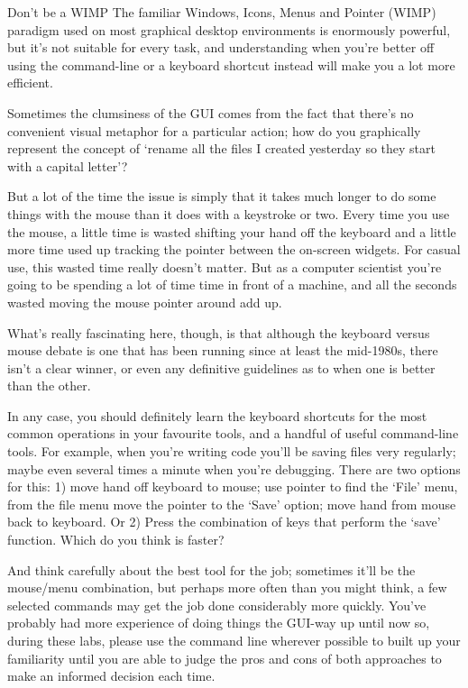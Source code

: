 \begin{diversion}{Don't be a WIMP}
\label{breakout:wimp}
The familiar Windows, Icons, Menus and Pointer (WIMP) paradigm used on most graphical desktop environments is enormously powerful, but it's not suitable for every task, and understanding when you're better off using the command-line or a keyboard shortcut instead will make you a lot more efficient.

Sometimes the clumsiness of the GUI comes from the fact that there's no convenient visual metaphor for a particular action; how do you graphically represent the concept of `rename all the files I created yesterday so they start with a capital letter'?

But a lot of the time the issue is simply that it takes much longer to do some things with the mouse than it does with a keystroke or two. Every time you use the mouse, a little time is wasted shifting your hand off the keyboard and a little more time used up tracking the pointer between the on-screen widgets. For casual use, this wasted time really doesn't matter. But as a computer scientist you're going to be spending a lot of time time in front of a machine, and all the seconds wasted moving the mouse pointer around add up.

What's really fascinating here, though, is that although the keyboard versus mouse debate is one that has been running since at least the mid-1980s, there isn't a clear winner, or even any definitive guidelines as to when one is better than the other.

In any case, you should definitely learn the keyboard shortcuts for the most common operations in your favourite tools, and a handful of useful command-line tools. For example, when you're writing code you'll be saving files very regularly; maybe even several times a minute when you're debugging. There are two options for this: 1) move hand off keyboard to mouse; use pointer to find the `File' menu, from the file menu move the pointer to the `Save' option; move hand from mouse back to keyboard. Or 2) Press the combination of keys that perform the `save' function. Which do you think is faster?

And think carefully about the best tool for the job; sometimes it'll be the mouse/menu combination, but perhaps more often than you might think, a few selected commands may get the job done considerably more quickly. You've probably had more experience of doing things the GUI-way up until now so, during these labs,  please use the command line wherever possible to built up your familiarity until you are able to judge the pros and cons of both approaches to make an informed decision each time.

\end{diversion}

